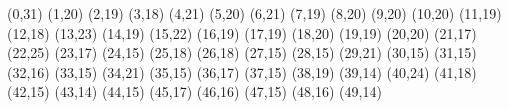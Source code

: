 (0,31)
(1,20)
(2,19)
(3,18)
(4,21)
(5,20)
(6,21)
(7,19)
(8,20)
(9,20)
(10,20)
(11,19)
(12,18)
(13,23)
(14,19)
(15,22)
(16,19)
(17,19)
(18,20)
(19,19)
(20,20)
(21,17)
(22,25)
(23,17)
(24,15)
(25,18)
(26,18)
(27,15)
(28,15)
(29,21)
(30,15)
(31,15)
(32,16)
(33,15)
(34,21)
(35,15)
(36,17)
(37,15)
(38,19)
(39,14)
(40,24)
(41,18)
(42,15)
(43,14)
(44,15)
(45,17)
(46,16)
(47,15)
(48,16)
(49,14)
